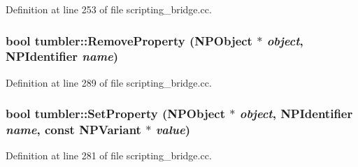 Definition at line 253 of file scripting\_\-bridge.cc.

\hypertarget{namespacetumbler_a4b3edf30d857d6821ff31c7676cae983}{
\subsubsection[{RemoveProperty}]{\setlength{\rightskip}{0pt plus 5cm}bool tumbler::RemoveProperty ({\bf NPObject} $\ast$ {\em object}, \/  {\bf NPIdentifier} {\em name})}}
\label{namespacetumbler_a4b3edf30d857d6821ff31c7676cae983}


Definition at line 289 of file scripting\_\-bridge.cc.

\hypertarget{namespacetumbler_a036219547d706a1d483feb048bcacc00}{
\subsubsection[{SetProperty}]{\setlength{\rightskip}{0pt plus 5cm}bool tumbler::SetProperty ({\bf NPObject} $\ast$ {\em object}, \/  {\bf NPIdentifier} {\em name}, \/  const {\bf NPVariant} $\ast$ {\em value})}}
\label{namespacetumbler_a036219547d706a1d483feb048bcacc00}


Definition at line 281 of file scripting\_\-bridge.cc.

